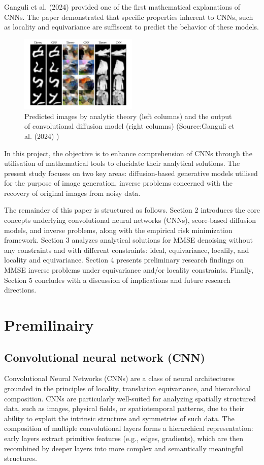 \documentclass[a4paper,10pt]{article}
\theoremstyle{definition} %
\theoremstyle{definition} %
\theoremstyle{definition} %
\theoremstyle{definition} %
\newcommand{\0}{\boldsymbol{0}}
\begin{document}
Ganguli et al. (2024) \cite{kamb2024analytictheorycreativityconvolutional} provided one of the first mathematical explanations of CNNs. The paper demonstrated that specific properties inherent to CNNs, such as locality and equivariance are suffiscent to predict the behavior of these models.
\begin{figure}[h] %
    \centering
    \includegraphics[width=0.5\textwidth]{../images/introduction_Ganguli.png} %
    \caption{Predicted images by analytic theory (left columns) and the output of convolutional diffusion model (right columns) (Source:Ganguli et al. (2024) \cite{kamb2024analytictheorycreativityconvolutional})}
    \label{fig:introduction_im}
\end{figure}

In this project, the objective is to enhance comprehension of CNNs through the utilisation of mathematical tools to elucidate their analytical solutions. The present study focuses on two key areas: diffusion-based generative models utilised for the purpose of image generation, inverse problems concerned with the recovery of original images from noisy data.

The remainder of this paper is structured as follows. Section 2 introduces the core concepts underlying convolutional neural networks (CNNs), score-based diffusion models, and inverse problems, along with the empirical risk minimization framework. Section 3 analyzes analytical solutions for MMSE denoising  without any constraints and with different constraints: ideal, equivariance, localily, and locality and equivariance. Section 4 presents preliminary research findings on MMSE inverse problems under  equivariance and/or locality constraints. Finally, Section 5 concludes with a discussion of implications and future research directions.

\section{Premilinairy}
\subsection{Convolutional neural network (CNN)}
Convolutional Neural Networks (CNNs) are a class of neural architectures grounded in the principles of locality, translation equivariance, and hierarchical composition. CNNs are particularly well-suited for analyzing spatially structured data, such as images, physical fields, or spatiotemporal patterns, due to their ability to exploit the intrinsic structure and symmetries of such data. The composition of multiple convolutional layers forms a hierarchical representation: early layers extract primitive features (e.g., edges, gradients), which are then recombined by deeper layers into more complex and semantically meaningful structures. 
\end{document}
